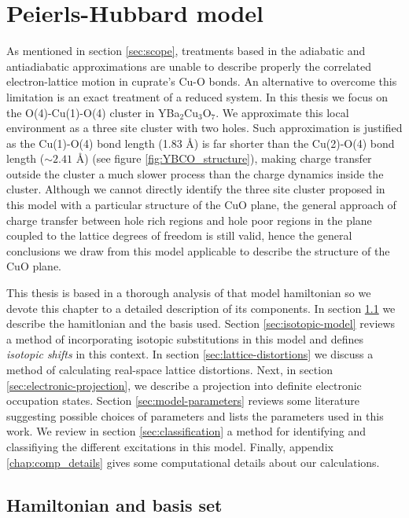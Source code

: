 \chapter{Peierls-Hubbard model}
\label{chap:model}

As mentioned in section \ref{sec:scope}, treatments based in the adiabatic and antiadiabatic approximations are unable to describe properly the correlated electron-lattice motion in cuprate's Cu-O bonds.
An alternative to overcome this limitation is an exact treatment of a reduced system.
In this thesis we focus on the O(4)-Cu(1)-O(4) cluster in YBa$_2$Cu$_3$O$_7$.
We approximate this local environment as a three site cluster with two holes. 
Such approximation is justified as the Cu(1)-O(4) bond length (1.83 \AA) is far shorter than the Cu(2)-O(4) bond length ($\sim 2.41$ \AA) (see figure \ref{fig:YBCO_structure}), making charge transfer outside the cluster a much slower process than the charge dynamics inside the cluster. 
Although we cannot directly identify the three site cluster proposed in this model with a particular structure of the CuO plane, the general approach of charge transfer between hole rich regions and hole poor regions in the plane coupled to the lattice degrees of freedom is still valid, hence the general conclusions we draw from this model applicable to describe the structure of the CuO plane.

This thesis is based in a thorough analysis of that model hamiltonian so we devote this chapter to a detailed description of its components.
In section \ref{sec:hamiltonian-and-basis} we describe the hamitlonian and the basis used. 
Section \ref{sec:isotopic-model} reviews a method of incorporating isotopic substitutions in this model and defines \textit{isotopic shifts} in this context.
In section \ref{sec:lattice-distortions} we discuss a method of calculating real-space lattice distortions.
Next, in section \ref{sec:electronic-projection}, we describe a projection into definite electronic occupation states.
Section \ref{sec:model-parameters} reviews some literature suggesting possible choices of parameters and lists the parameters used in this work.
We review in section \ref{sec:classification} a method for identifying and classifiying the different excitations in this model.
Finally, appendix \ref{chap:comp_details} gives some computational details about our calculations.

\section{Hamiltonian and basis set}
\label{sec:hamiltonian-and-basis}

